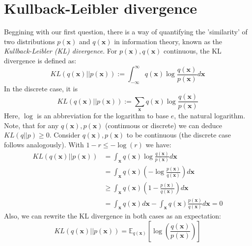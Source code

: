 \documentclass[12pt]{report}
\theoremstyle{definition}
\begin{document}
\section{Kullback-Leibler divergence}
Beggining with our first question, there is a way of quantifying the 'similarity' of two distributions $p(\mathbf{x})$ and $q(\mathbf{x})$ in information theory, known as the \emph{Kullback-Leibler (KL) divergence}. For $p(\mathbf{x}), q(\mathbf{x})$ continuous, the KL divergence is defined as:
\begin{equation}
	KL(q(\mathbf{x})||p(\mathbf{x})) := \int_{-\infty}^{\infty} q(\mathbf{x}) \log \frac{q(\mathbf{x})}{p(\mathbf{x})} d \mathbf{x}
\end{equation}
In the discrete case, it is
\begin{equation}
	KL(q(\mathbf{x})||p(\mathbf{x})) := \sum_{\mathbf{x}} q(\mathbf{x}) \log \frac{q(\mathbf{x})}{p(\mathbf{x})}
\end{equation}
Here, $\log$ is an abbreviation for the logarithm to base $e$, the natural logarithm. Note, that for any $q(\mathbf{x}), p(\mathbf{x})$ (continuous or discrete) we can deduce $KL(q||p) \geq 0$.
Consider $q(\mathbf{x}), p(\mathbf{x})$ to be continuous (the discrete case follows analogously). With $1 - r \leq -\log(r)$ we have:
\begin{equation}
\begin{split}
KL(q(\mathbf{x})||p(\mathbf{x}))
& = \int_{\mathbf{x}} q(\mathbf{x}) \log \frac{q(\mathbf{x})}{p(\mathbf{x})} d \mathbf{x} \\
& = \int_{\mathbf{x}} q(\mathbf{x}) (- \log \frac{p(\mathbf{x})}{q(\mathbf{x})}) d \mathbf{x} \\
& \geq \int_{\mathbf{x}} q(\mathbf{x}) (1 - \frac{p(\mathbf{x})}{q(\mathbf{x})}) d \mathbf{x} \\
& = \int_{\mathbf{x}} q(\mathbf{x}) d \mathbf{x} - \int_{\mathbf{x}} q(\mathbf{x}) \frac{p(\mathbf{x})}{q(\mathbf{x})} d \mathbf{x} = 0
\end{split}
\end{equation}
Also, we can rewrite the KL divergence in both cases as an expectation:
\begin{equation}
	KL(q(\mathbf{x})||p(\mathbf{x})) = \mathbb{E}_{q(\mathbf{x})}\left[ \log\left(\frac{q(\mathbf{x})}{p(\mathbf{x})} \right) \right]
\end{equation}
\end{document}
